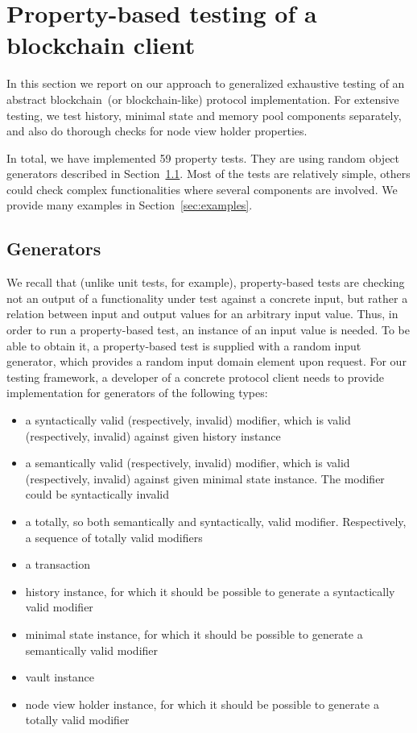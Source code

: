 
\section{Property-based testing of a blockchain client}
\label{sec:props}

In this section we report on our approach to generalized exhaustive testing of an abstract blockchain~(or blockchain-like) protocol implementation. For extensive testing, we test history, minimal state and memory pool components separately, and also do thorough checks for node view holder properties.
	
In total, we have implemented 59 property tests. They are using random object generators described in Section~\ref{sec:generators}. Most of the tests are relatively simple, others could check complex functionalities where several components are involved. We provide many examples in Section~\ref{sec:examples}.

\subsection{Generators}
\label{sec:generators}

We recall that (unlike unit tests, for example), property-based tests are checking not an output of a functionality under test against a concrete input, but rather a relation between input and output values for an arbitrary input value. Thus, in order to run a property-based test, an instance of an input value is needed. To be able to obtain it, a property-based test is supplied with a random input generator, which provides a random input domain element upon request. For our testing framework, a developer of a concrete protocol client needs to provide implementation for generators of the following types:

\begin{itemize}
	\item{a syntactically valid (respectively, invalid) modifier, which is valid (respectively, invalid) against given history instance}
	\item{a semantically valid (respectively, invalid) modifier, which is valid (respectively, invalid) against given minimal state instance. The modifier could be syntactically invalid}
	\item{a totally, so both semantically and syntactically, valid modifier. Respectively, a sequence of totally valid modifiers}
	\item{a transaction}
	\item{history instance, for which it should be possible to generate a syntactically valid modifier}
	\item{minimal state instance, for which it should be possible to generate a semantically valid modifier}
	\item{vault instance}
	\item{node view holder instance, for which it should be possible to generate a totally valid modifier}
\end{itemize}

